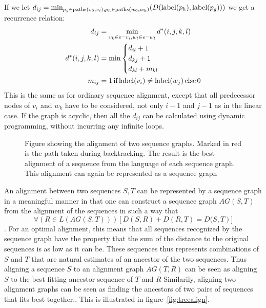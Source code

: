 If we let $d_{ij} = \min_{p_g \in \paths(v_0, v_i), p_h \in \paths(w_0, w_k)}(D(\slabel(p_h), \slabel(p_g)))$ we get a recurrence relation:
\begin{align*}
  d_{ij} &= \min_{v_k \in \preds{v_i}, w_l \in \preds{w_l}} d^*(i, j, k, l)\\
  d^*(i, j, k, l) &= \min \begin{cases}
    d_{il} + 1\\
    d_{kj} + 1\\
    d_{kl} + m_{kl}\\
    \end{cases}    
    \\
    m_{ij} &= 1\, \text{if}\, \slabel(v_i) \neq \slabel(w_j)\, \text{else}\, 0\\
\end{align*}
This is the same as for ordinary sequence alignment, except that all predecessor nodes of $v_i$ and $w_k$ have to be considered, not only $i-1$ and $j-1$ as in the linear case. If the graph is acyclic, then all the $d_{ij}$ can be calculated using dynamic programming, without incurring any infinite loops.
\begin{figure}
  \begin{tikzpicture}
    
  \end{tikzpicture}
  \label{fig:seqgrapha}
  \caption{Figure showing the alignment of two sequence graphs. Marked in red is the path taken during backtracking. The result is the best alignment of a sequence from the language of each sequence graph. This alignment can again be represented as a sequence graph}
\end{figure}

An alignment between two sequences $S, T$ can be represented by a sequence graph in a meaningful manner in that one can construct a sequence graph $AG(S, T)$ from the alignment of the sequences in such a way that 
\[
\forall (R \in L(AG(S, T)))\left[D(S, R)+D(R, T) =  D(S, T\right)]
\].
For an optimal alignment, this means that all sequences recognized by the sequence graph have the property that the sum of the distance to the original sequences is as low as it can be.
These sequences thus represents combinations of $S$ and $T$ that are natural estimates of an ancestor of the two sequences.
Thus aligning a sequence $S$ to an alignment graph $AG(T, R)$  can be seen as aligning $S$ to the best fitting ancestor sequence of $T$ and $R$
Similarily, aligning two alignment graphs can be seen as finding the ancestors of two pairs of sequences that fits best together.\cite{treealign}. This is illustrated in figure~\ref{fig:treealign}.

